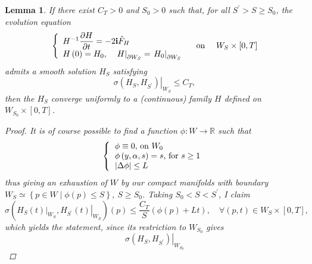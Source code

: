 \documentclass{article}
\newtheorem{lemma}[theorem]{Lemma}
\begin{document}
\begin{lemma}           \label{Lemma smooth sols on Ws for finite time}
If there exist $C_{T}>0$ and $S_{0}>0$ such that, for all $S^{\prime }>S\geq S_{0}$, the evolution equation
\begin{equation*}
\left\{ 
\begin{array}{l}
        H^{-1}\dfrac{\partial H}{\partial t}=-2\mathbf{i}\hat{F}_{H} \\ 
        \multicolumn{1}{c}{H\left( 0\right) =H_{0},
        \quad \left. H\right\vert_{\partial W_{S}}
        =\left. H_{0}\right\vert _{\partial W_{S}}}%
\end{array}%
\right. \quad \text{on } \quad W_{S}\times \left[ 0,T\right]
\end{equation*}%
admits a smooth solution $H_{S}$ satisfying%
\begin{equation*}
        \left.\sigma \left( H_{S},H_{S^{\prime }}\right) \right\vert _{W_{S}}
        \leq C_{T},
\end{equation*}%
then the $H_{S}$ converge uniformly to a (continuous) family $H$ defined on $W_{S_{0}}\times \left[ 0,T\right] $.
\begin{proof}
It is of course possible to find a function $\phi :W\rightarrow \mathbb{R}$
such that%
\begin{equation*}
\left\{ 
\begin{tabular}{l}
        $\phi \equiv 0$, on $W_{0}$ \\ 
        $\phi \left( y,\alpha ,s\right) =s$, for $s\geq 1$ \\ 
        $\left\vert \Delta \phi \right\vert \leq L$%
\end{tabular}%
\right. 
\end{equation*}%
thus giving an exhaustion of $W$ by our compact manifolds with boundary $W_{S}\simeq
\left\{ p\in W\mid \phi \left( p\right) \leq S\right\} $, $S\geq S_{0}$.
Taking $S_{0}<S<S^{\prime }$, I claim 
\begin{equation*}
        \sigma \left( \left. H_{S}\left( t\right) \right\vert _{W_{S}},
        \left. H_{S^{\prime }}\left(t\right) \right\vert _{W_{S}}\right)
         \left( p\right) \leq \frac{C_{T}}{S}
         \left(\phi \left( p\right) +Lt\right) ,\quad 
         \forall \left( p,t\right) \in W_{S}\times \left[ 0,T\right] ,
\end{equation*}%
which yields the statement, since its restriction to $W_{S_{0}}$ gives 
\begin{equation*}
        \left.\sigma\left(H_{S},H_{S^{\prime}}\right)\right\vert_{W_{S_{0}}}

\end{equation*}
\end{proof}
\end{lemma}
\end{document}
